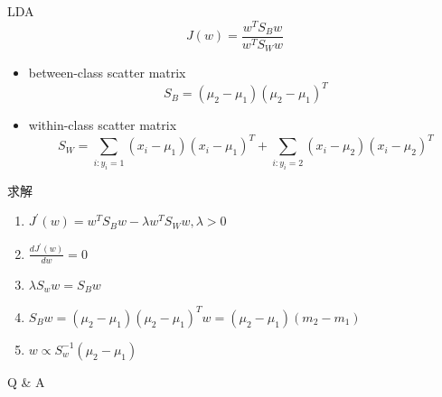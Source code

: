 \documentclass[xetex,mathserif,serif]{beamer}
\begin{document}
\begin{frame}{LDA}
\[J\left( w \right) = \frac{{{w^T}{S_B}w}}{{{w^T}{S_W}w}}\]
\begin{itemize}
  \item between-class scatter matrix \[ S_B = (\mu_2 - \mu_1){(\mu_2 - \mu_1)}^T \]
  \item within-class scatter matrix \[{S_W} = \sum\limits_{i:{y_i} = 1} {\left( {{x_i} - {\mu _1}} \right){{\left( {{x_i} - {\mu _1}} \right)}^T}}  + \sum\limits_{i:{y_i} = 2} {\left( {{x_i} - {\mu _2}} \right){{\left( {{x_i} - {\mu _2}} \right)}^T}} \]
\end{itemize}
\end{frame}

\begin{frame}{求解}
\begin{enumerate}
  \item ${J^'}\left( w \right) = {w^T}{S_B}w - \lambda {w^T}{S_W}w,\lambda  > 0$
  \item $\frac{{d{J^'}\left( w \right)}}{{dw}} = 0$
  \item $\lambda {S_w}w = {S_B}w$
  \item ${S_B}w = \left( {{\mu _2} - {\mu _1}} \right){\left( {{\mu _2} - {\mu _1}} \right)^T}w = \left( {{\mu _2} - {\mu _1}} \right)\left( {{m_2} - {m_1}} \right)$
  \item $ w \propto S_w^{ - 1}\left( {{\mu _2} - {\mu _1}} \right)$
\end{enumerate}
\end{frame}

\begin{frame}
\begin{center}
  \Large {Q \& A}
\end{center}
\end{frame}
\end{document}
